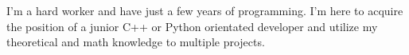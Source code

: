 \documentclass[10pt,a4paper,ragged2e,withhyper]{altacv}
\begin{document}
\begin{paracol}{2}
            \smallskip
        
        
        
        
        
        \newpage
        
        \switchcolumn
        
            \begin{text}
               I'm a hard worker and have just a few years of programming. I'm here to acquire the position of a junior C++ or Python orientated developer and utilize my theoretical and math knowledge to multiple projects. 
            \end{text}
        
            

\end{paracol}
\end{document}
